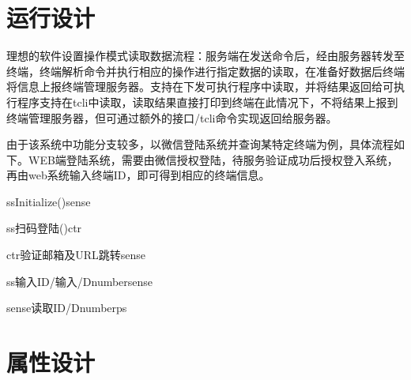 \documentclass[UTF8]{ctexart}
\newcommand{\note}[1]{\textcolor{blue}{\emph{[#1]}}}   %
\begin{document}
    \section{运行设计}%
	 \par{理想的软件设置操作模式读取数据流程：服务端在发送命令后，经由服务器转发至终端，终端解析命令并执行相应的操作进行指定数据的读取，在准备好数据后终端将信息上报终端管理服务器。支持在下发可执行程序中读取，并将结果返回给可执行程序支持在tcli中读取，读取结果直接打印到终端在此情况下，不将结果上报到终端管理服务器，但可通过额外的接口/tcli命令实现返回给服务器。}
	 \par{由于该系统中功能分支较多，以微信登陆系统并查询某特定终端为例，具体流程如下。WEB端登陆系统，需要由微信授权登陆，待服务验证成功后授权登入系统，再由web系统输入终端ID，即可得到相应的终端信息。}\\
	 	\begin{center}
		\centering
		\begin{sequencediagram}
			\begin{call}{ss}{Initialize()}{sense}{}
			\end{call}
				\begin{call}{ss}{扫码登陆()}{ctr}{}
				\begin{call}{ctr}{验证邮箱及URL跳转}{sense}{}
					\end{call}
				\end{call}
			
				
				\begin{call}{ss}{输入ID/输入/Dnumber}{sense}{}
				\begin{call}{sense}{读取ID/Dnumber}{ps}{}		
			\end{call}
		\end{call}
				
		\end{sequencediagram}
		\end{center}
		
    \newpage
    \section{属性设计}
\end{document}

